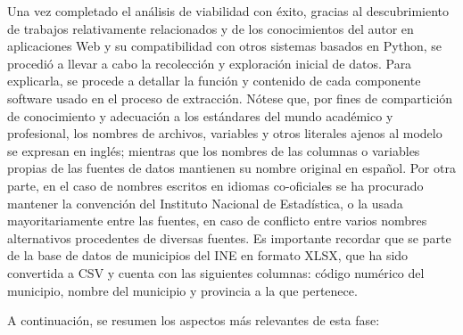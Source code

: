 Una vez completado el análisis de viabilidad con éxito, gracias al descubrimiento de trabajos relativamente relacionados y de los conocimientos del autor en aplicaciones Web y su compatibilidad con otros sistemas basados en Python, se procedió a llevar a cabo la recolección y exploración inicial de datos. Para explicarla, se procede a detallar la función y contenido de cada componente software usado en el proceso de extracción. Nótese que, por fines de compartición de conocimiento y adecuación a los estándares del mundo académico y profesional, los nombres de archivos, variables y otros literales ajenos al modelo se expresan en inglés; mientras que los nombres de las columnas o variables propias de las fuentes de datos mantienen su nombre original en español. Por otra parte, en el caso de nombres escritos en idiomas co-oficiales se ha procurado mantener la convención del Instituto Nacional de Estadística, o la usada mayoritariamente entre las fuentes, en caso de conflicto entre varios nombres alternativos procedentes de diversas fuentes. Es importante recordar que se parte de la base de datos de municipios del INE en formato XLSX, que ha sido convertida a CSV y cuenta con las siguientes columnas: código numérico del municipio, nombre del municipio y provincia a la que pertenece. 

A continuación, se resumen los aspectos más relevantes de esta fase:

